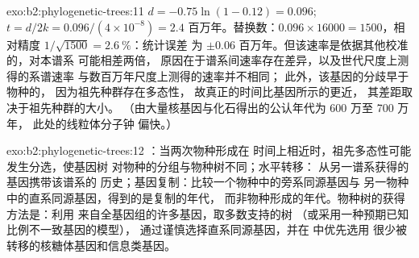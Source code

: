 \begin{solution}{exo:b2:phylogenetic-trees:11}
$d = -0.75\ln(1 - 0.12) = 0.096$; $t = d/2k = 0.096/(4\times 10^{-8})
= 2.4$ 百万年。替换数：$0.096\times \num{16000} =
1500$，相对精度 $1/\sqrt{1500} = \qty{2.6}{\%}$：统计误差
为 $\pm 0.06$ 百万年。但该速率是依据其他校准的，对本谱系
可能相差两倍，
原因在于谱系间速率存在差异，以及世代尺度上测得的系谱速率
与数百万年尺度上测得的速率并不相同；
此外，该基因的分歧早于物种的，
因为祖先种群存在多态性，
故真正的时间比基因所示的更近，
其差距取决于祖先种群的大小。
（由大量核基因与化石得出的公认年代为 600 万至 700 万年，
此处的线粒体分子钟
偏快。）
\end{solution}

\begin{solution}{exo:b2:phylogenetic-trees:12}
：当两次物种形成在
时间上相近时，祖先多态性可能发生分选，使基因树
对物种的分组与物种树不同；水平转移：
从另一谱系获得的基因携带该谱系的
历史；基因复制：比较一个物种中的旁系同源基因与
另一物种中的直系同源基因，得到的是复制的年代，
而非物种形成的年代。物种树的获得方法是：利用
来自全基因组的许多基因，取多数支持的树
（或采用一种预期已知比例不一致基因的模型），
通过谨慎选择直系同源基因，并在
中优先选用
很少被转移的核糖体基因和信息类基因。
\end{solution}

